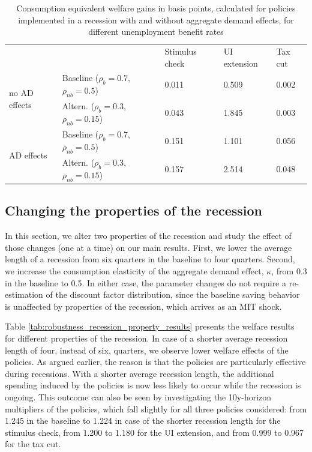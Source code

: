 \documentclass[\econtexRoot/HAFiscal]{subfiles}
\begin{document}
\begin{table}[]
  \begin{center}
    \begin{tabular}{@{}lllll@{}}
      \toprule
      &                    & Stimulus check & UI extension & Tax cut \\ \cmidrule(l){1-5} 
      \multirow{2}{*}{no AD effects} 	& Baseline  ($\rho_{b}=0.7$, $\rho_{nb}=0.5$) 		& 0.011          & 0.509        & 0.002   \\
      & Altern.  ($\rho_{b}=0.3$, $\rho_{nb}=0.15$) 	& 0.043          & 1.845        & 0.003   \\ \cmidrule(l){1-5} 
      \multirow{2}{*}{AD effects}		& Baseline  ($\rho_{b}=0.7$, $\rho_{nb}=0.5$)    	& 0.151          & 1.101        & 0.056   \\
      & Altern.  ($\rho_{b}=0.3$, $\rho_{nb}=0.15$)    & 0.157          & 2.514        & 0.048   \\ \cmidrule(l){1-5} 
    \end{tabular}
    \caption{Consumption equivalent welfare gains in basis points, calculated for policies implemented in a recession with and without aggregate demand effects, for different unemployment benefit rates}
    \notinsubfile{\label{tab:robustness_benefit_results}}
  \end{center}
\end{table}




\FloatBarrier
\hypertarget{changing-the-properties-of-the-recession}{}\par\subsection{Changing the properties of the recession}

In this section, we alter two properties of the recession and study the effect of those changes (one at a time) on our main results. First, we lower the average length of a recession from six quarters in the baseline to four quarters. Second, we increase the consumption elasticity of the aggregate demand effect, $\kappa$, from 0.3 in the baseline to 0.5. In either case, the parameter changes do not require a re-estimation of the discount factor distribution, since the baseline saving behavior is unaffected by properties of the recession, which arrives as an MIT shock. 

Table \ref{tab:robustness_recession_property_results} presents the welfare results for different properties of the recession. In case of a shorter average recession length of four, instead of six, quarters, we observe lower welfare effects of the policies. As argued earlier, the reason is that the policies are particularly effective during recessions. With a shorter average recession length, the additional spending induced by the policies is now less likely to occur while the recession is ongoing. This outcome can also be seen by investigating the 10y-horizon multipliers of the policies, which fall slightly for all three policies considered: from 1.245 in the baseline to 1.224 in case of the shorter recession length for the stimulus check, from 1.200 to 1.180 for the UI extension, and from 0.999 to 0.967 for the tax cut.
\end{document}
